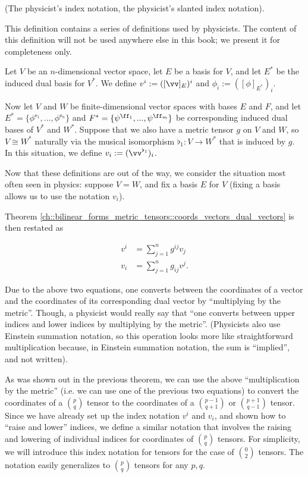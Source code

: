 \begin{defn}
    (The physicist's index notation, the physicist's slanted index notation).

    This definition contains a series of definitions used by physicists. The content of this definition will not be used anywhere else in this book; we present it for completeness only.
    
    Let $V$ be an $n$-dimensional vector space, let $E$ be a basis for $V$, and let $E^*$ be the induced dual basis for $V^*$. We define $v^i := ([\vv]_E)^i$ and $\phi_i := ([\phi]_{E^*})_i$.

    Now let $V$ and $W$ be finite-dimensional vector spaces with bases $E$ and $F$, and let $E^* = \{\phi^{\ee_1}, ..., \phi^{\ee_n}\}$ and $F^* = \{\psi^{\ff_1}, ..., \psi^{\ff_m}\}$ be corresponding induced dual bases of $V^*$ and $W^*$. Suppose that we also have a metric tensor $g$ on $V$ and $W$, so $V \cong W^*$ naturally via the musical isomorphism $\flat_1:V \rightarrow W^*$ that is induced by $g$. In this situation, we define $v_i := (\vv^{\flat_1})_i$.
    
    Now that these definitions are out of the way, we consider the situation most often seen in physics: suppose $V = W$, and fix a basis $E$ for $V$ (fixing a basis allows us to use the notation $v_i$). 
    
    Theorem \ref{ch::bilinear_forms_metric_tensors::coords_vectors_dual_vectors} is then restated as

    \begin{align*}
        v^i &= \sum_{j = 1}^n g^{ij} v_j \\
        v_i &= \sum_{j = 1}^n g_{ij} v^j.
    \end{align*}
    
    Due to the above two equations, one converts between the coordinates of a vector and the coordinates of its corresponding dual vector by ``multiplying by the metric''. Though, a physicist would really say that ``one converts between upper indices and lower indices by multiplying by the metric''. (Physicists also use Einstein summation notation, so this operation looks more like straightforward multiplication because, in Einstein summation notation, the sum is ``implied'', and not written).
    
    As was shown out in the previous theorem, we can use the above ``multiplication by the metric'' (i.e. we can use one of the previous two equations) to convert the coordinates of a $\binom{p}{q}$ tensor to the coordinates of a $\binom{p - 1}{q + 1}$ or $\binom{p + 1}{q - 1}$ tensor. Since we have already set up the index notation $v^i$ and $v_i$, and shown how to ``raise and lower'' indices, we define a similar notation that involves the raising and lowering of individual indices for coordinates of $\binom{p}{q}$ tensors. For simplicity, we will introduce this index notation for tensors for the case of $\binom{0}{2}$ tensors. The notation easily generalizes to $\binom{p}{q}$ tensors for any $p, q$.
    

\end{defn}
